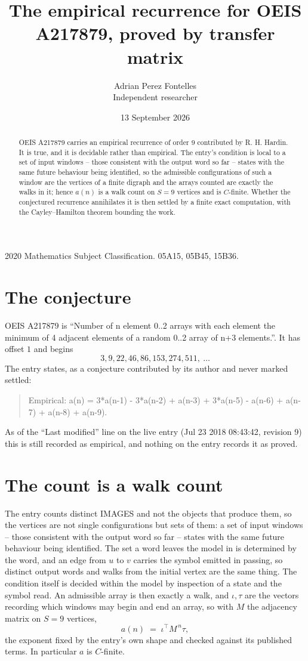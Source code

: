 \documentclass[11pt,a4paper]{article}
\title{The empirical recurrence for OEIS A217879, proved by transfer matrix}
\author{Adrian Perez Fontelles\\ \small Independent researcher}
\date{13 September 2026}
\theoremstyle{plain}
\theoremstyle{definition}
\begin{document}
\maketitle

\begin{abstract}
OEIS A217879 carries an empirical recurrence of order $9$ contributed by R. H. Hardin. It is
true, and it is decidable rather than empirical. The entry's condition is local to a set of input windows -- those consistent with the output word so far -- states with the same future behaviour being identified, so
the admissible configurations of such a window are the vertices of a finite digraph and the
arrays counted are exactly the walks in it; hence $a(n)$ is a walk count on $S=9$ vertices
and is $C$-finite. Whether the conjectured recurrence annihilates it is then settled by a
finite exact computation, with the Cayley--Hamilton theorem bounding the work.
\end{abstract}

\noindent\small 2020 Mathematics Subject Classification. 05A15, 05B45, 15B36.\normalsize

\section{The conjecture}

OEIS A217879 is ``Number of n element 0..2 arrays with each element the minimum of 4 adjacent elements of a random 0..2 array of n+3 elements.''. It has offset $1$ and begins
\[
3, 9, 22, 46, 86, 153, 274, 511,\ \dots
\]
The entry states, as a conjecture contributed by its author and never marked settled:
\begin{quote}
Empirical: a(n) = 3*a(n-1) - 3*a(n-2) + a(n-3) + 3*a(n-5) - a(n-6) + a(n-7) + a(n-8) + a(n-9).
\end{quote}
As of the ``Last modified'' line on the live entry (Jul 23 2018 08:43:42, revision 9) this is still
recorded as empirical, and nothing on the entry records it as proved.

\section{The count is a walk count}

The entry counts distinct IMAGES and not the objects that produce them, so the vertices are not single configurations but sets of them: a set of input windows -- those consistent with the output word so far -- states with the same future behaviour being identified. The set a word leaves the model in is determined by the word, and an edge from $u$ to $v$ carries the symbol emitted in passing, so distinct output words and walks from the initial vertex are the same thing. The condition itself is decided within the model by inspection of a state and the symbol read.
An admissible array is then exactly a walk, and $\iota,\tau$ are the vectors recording which windows may begin and end an array, so with $M$ the adjacency matrix on $S=9$ vertices,
\[
a(n)\;=\;\iota^{\!\top}M^{\,n}\tau ,
\]
the exponent fixed by the entry's own shape and checked against its published terms. In
particular $a$ is $C$-finite.
\end{document}

